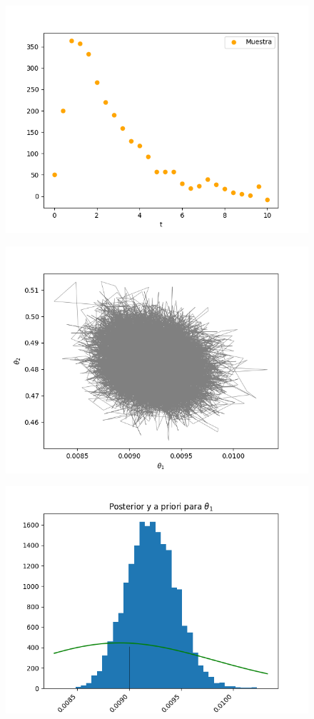 \begin{figure}[H] 
    \centering 
    \includegraphics[width = 10 cm]{img/Exp_Central_SIR_sigma/Figuras/Generales/Muestra_SIR_sigma.png} 
\end{figure} 


\begin{figure}[H] 
    \centering 
    \includegraphics[width = 10 cm]{img/Exp_Central_SIR_sigma/Figuras/Generales/Conjunta_SIR_sigma.png} 
\end{figure} 

\begin{figure}[H] 
    \centering 
    \includegraphics[width = 10 cm ]{img/Exp_Central_SIR_sigma/Figuras/Generales/Post_theta1_SIR_sigma.png} 
\end{figure} 


